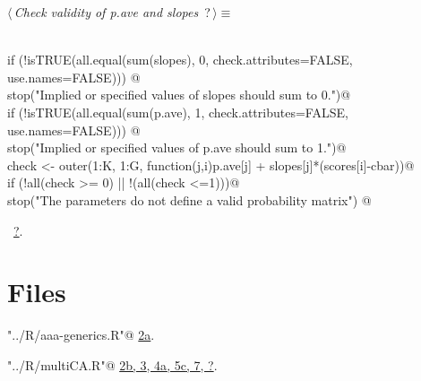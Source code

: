 \documentclass[reqno]{amsart}
\renewcommand{\NWtarget}[2]{\hypertarget{#1}{#2}}
\renewcommand{\NWlink}[2]{\hyperlink{#1}{#2}}
\begin{document}
\begin{flushleft} \small\label{scrap13}\raggedright\small
\NWtarget{nuweb?}{} $\langle\,${\itshape Check validity of p.ave and slopes}\nobreak\ {\footnotesize {?}}$\,\rangle\equiv$
\vspace{-1ex}
\begin{list}{}{} \item
\mbox{}\verb@@\\
\mbox{}\verb@  if (!isTRUE(all.equal(sum(slopes), 0, check.attributes=FALSE, use.names=FALSE))) @\\
\mbox{}\verb@      stop("Implied or specified values of slopes should sum to 0.")@\\
\mbox{}\verb@  if (!isTRUE(all.equal(sum(p.ave), 1, check.attributes=FALSE, use.names=FALSE))) @\\
\mbox{}\verb@      stop("Implied or specified values of p.ave should sum to 1.")@\\
\mbox{}\verb@  check <- outer(1:K, 1:G, function(j,i)p.ave[j] + slopes[j]*(scores[i]-cbar))@\\
\mbox{}\verb@  if (!all(check >= 0) || !(all(check <=1)))@\\
\mbox{}\verb@    stop("The parameters do not define a valid probability matrix")  @\\
\mbox{}\verb@@{\NWsep}
\end{list}
\vspace{-1.5ex}
\footnotesize
\begin{list}{}{\setlength{\itemsep}{-\parsep}\setlength{\itemindent}{-\leftmargin}}
\item \NWtxtMacroRefIn\ \NWlink{nuweb?}{?}.

\item{}
\end{list}
\vspace{4ex}
\end{flushleft}
\section{Files}


{\small\begin{list}{}{\setlength{\itemsep}{-\parsep}\setlength{\itemindent}{-\leftmargin}}
\item \verb@"../R/aaa-generics.R"@ {\footnotesize {\NWtxtDefBy} \NWlink{nuweb2a}{2a}.}
\item \verb@"../R/multiCA.R"@ {\footnotesize {\NWtxtDefBy} \NWlink{nuweb2b}{2b}\NWlink{nuweb3}{, 3}\NWlink{nuweb4a}{, 4a}\NWlink{nuweb5c}{, 5c}\NWlink{nuweb7}{, 7}\NWlink{nuweb?}{, ?}.
}
\end{list}}
\end{document}
